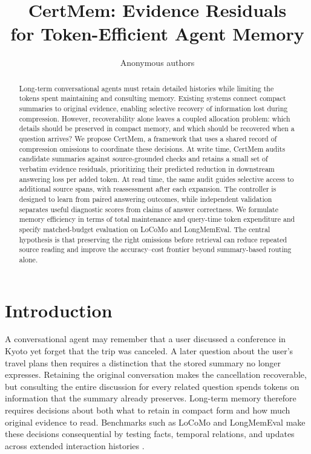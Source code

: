 \documentclass{article}
\title{CertMem: Evidence Residuals\\for Token-Efficient Agent Memory}
\author{Anonymous authors}
\begin{document}
\maketitle
{}

\begin{abstract}
Long-term conversational agents must retain detailed histories while limiting the
tokens spent maintaining and consulting memory. Existing systems connect compact
summaries to original evidence, enabling selective recovery of information lost
during compression. However, recoverability alone leaves a coupled allocation
problem: which details should be preserved in compact memory, and which should
be recovered when a question arrives? We propose CertMem, a framework that uses
a shared record of compression omissions to coordinate these decisions. At write
time, CertMem audits candidate summaries against source-grounded checks and
retains a small set of verbatim evidence residuals, prioritizing their predicted
reduction in downstream answering loss per added token. At read time, the same
audit guides selective access to additional source spans, with reassessment after
each expansion. The controller is designed to learn from paired answering
outcomes, while independent validation separates useful diagnostic scores from
claims of answer correctness. We formulate memory efficiency in terms of total
maintenance and query-time token expenditure and specify matched-budget
evaluation on LoCoMo and LongMemEval. The central hypothesis is that preserving
the right omissions before retrieval can reduce repeated source reading and
improve the accuracy--cost frontier beyond summary-based routing alone.
\end{abstract}

\section{Introduction}

A conversational agent may remember that a user discussed a conference in Kyoto
yet forget that the trip was canceled. A later question about the user's travel
plans then requires a distinction that the stored summary no longer expresses.
Retaining the original conversation makes the cancellation recoverable, but
consulting the entire discussion for every related question spends tokens on
information that the summary already preserves. Long-term memory therefore
requires decisions about both what to retain in compact form and how much
original evidence to read. Benchmarks such as LoCoMo and LongMemEval make these
decisions consequential by testing facts, temporal relations, and updates across
extended interaction histories \citep{locomo,longmemeval}.
\end{document}
